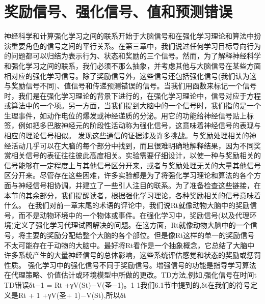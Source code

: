 \section{奖励信号、强化信号、值和预测错误}

神经科学和计算强化学习之间的联系开始于大脑信号和在强化学习理论和算法中扮演重要角色的信号之间的平行关系。在第三章中，我们说过任何学习目标导向行为的问题都可以归结为表示行为、状态和奖励的三个信号。然而，为了解释神经科学和强化学习之间的联系，我们必须不那么抽象，并考虑其他与大脑信号在某些方面相对应的强化学习信号。除了奖励信号外，这些信号还包括强化信号(我们认为这与奖励信号不同)、值信号和传递预测错误的信号。当我们用函数来标记一个信号时，我们是在强化学习理论的背景下进行的，在强化学习理论中，信号对应于方程或算法中的一个项。另一方面，当我们提到大脑中的一个信号时，我们指的是一个生理事件，如动作电位的爆发或神经递质的分泌。用它的功能给神经信号贴上标签，例如把多巴胺神经元的阶段性活动称为强化信号，这意味着神经信号的表现与相应的理论信号相似。
发现这些通信的证据涉及许多挑战。与奖励处理相关的神经活动几乎可以在大脑的每个部分中找到，而且很难明确地解释结果，因为不同奖赏相关信号的表征往往彼此高度相关。实验需要仔细设计，以使一种与奖励相关的信号能够在一定程度上与其他信号区分开来，或者与奖励处理无关的大量其他信号区分开来。尽管存在这些困难，许多实验都是为了将强化学习理论和算法的各个方面与神经信号相协调，并建立了一些引人注目的联系。为了准备检查这些链接，在本节的其余部分，我们提醒读者，根据强化学习理论，各种奖励相关的信号意味着什么。
在我们对前一章末尾的术语的评论中，我们说Rt就像动物大脑中的奖励信号，而不是动物环境中的一个物体或事件。在强化学习中，奖励信号(以及代理环境)定义了强化学习代理试图解决的问题。在这方面，Rt就像动物大脑中的一个信号，将主要的奖励分配给整个大脑的各个部位。但是像Rt这样的单一的奖励信号不太可能存在于动物的大脑中。最好将Rt看作是一个抽象概念，它总结了大脑中许多系统产生的大量神经信号的总体影响，这些系统评估感觉和状态的奖励或惩罚性质。
强化学习中的强化信号不同于奖励信号。增强信号的功能是指导学习算法在代理策略、价值估计或环境模型中所做的更改。TD方法,例如,强化信号在时间t TD错误δt−1 = Rt +γV(St)−V(圣−1)。1
1我们6.1节中提到的,δt在我们的符号定义是Rt + 1 +γV(圣+ 1)−V(St),所以δt

